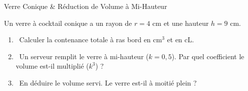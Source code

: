 \begin{exercice}[3 pts][\capAnalyser]{Verre Conique \& Réduction de Volume à Mi-Hauteur}
\noindent
\begin{minipage}[c]{0.58\linewidth}
Un verre à cocktail conique a un rayon de $r = 4\text{ cm}$ et une hauteur $h = 9\text{ cm}$.
\begin{enumerate}[leftmargin=1.2em, itemsep=1pt]
    \item \capRealiser\ Calculer la contenance totale à ras bord en $\text{cm}^3$ et en $\text{cL}$.
    \item \capAnalyser\ Un serveur remplit le verre à mi-hauteur ($k = 0{,}5$). Par quel coefficient le volume est-il multiplié ($k^3$) ?
    \item \capValider\ En déduire le volume servi. Le verre est-il à moitié plein ?
\end{enumerate}
\end{minipage}\hfill
\begin{minipage}[c]{0.38\linewidth}
\centering
{}
\end{minipage}

\vspace{1mm}
\lignesreponse[2]
\end{exercice}

